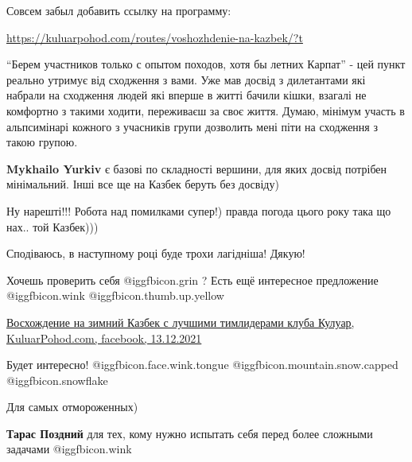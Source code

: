  
 
 
 
 
\zzSecCmt

\begin{itemize} %
Совсем забыл добавить ссылку на программу: 

\url{https://kuluarpohod.com/routes/voshozhdenie-na-kazbek/?t}


\enquote{Берем участников только с опытом походов, хотя бы летних Карпат} - цей пункт
реально утримує від сходження з вами. Уже мав досвід з дилетантами які набрали
на сходження людей які вперше в житті бачили кішки, взагалі не комфортно з
такими ходити, переживаєш за своє життя. Думаю, мінімум участь в альпсимінарі
кожного з учасників групи дозволить мені піти на сходження з такою групою.

\begin{itemize} %
\textbf{Mykhailo Yurkiv} є базові по складності вершини, для яких досвід потрібен мінімальний. Інші все ще на Казбек беруть без досвіду)

\end{itemize} %

Ну нарешті!!! Робота над помилками супер!) правда погода цього року така що нах.. той Казбек)))


Сподіваюсь, в наступному році буде трохи лагідніша! Дякую!

Хочешь проверить себя  @igg{fbicon.grin} ?
Есть ещё интересное предложение  @igg{fbicon.wink}  @igg{fbicon.thumb.up.yellow} 

\href{https://www.facebook.com/kuluarpohod/posts/4576301432458728}{%
Восхождение на зимний Казбек с лучшими тимлидерами клуба Кулуар, KuluarPohod.com, facebook, 13.12.2021}

Будет интересно! @igg{fbicon.face.wink.tongue}
@igg{fbicon.mountain.snow.capped} ️@igg{fbicon.snowflake}

\begin{itemize} %
Для самых отмороженных)

\textbf{Тарас Поздний} для тех, кому нужно испытать себя перед более сложными задачами @igg{fbicon.wink} 
\end{itemize} %


\end{itemize}

